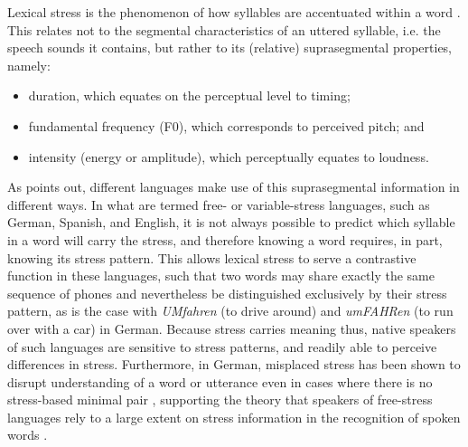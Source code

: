 			Lexical stress is the phenomenon of how syllables are accentuated within a word  \citep{Cutler2005}. This relates not to the segmental characteristics of an uttered syllable, i.e. the speech sounds it contains, but rather to its (relative) suprasegmental properties, namely: %
			\begin{itemize}
			\item duration, which equates on the perceptual level to timing;
			\item fundamental frequency (F0), which corresponds to perceived pitch; and
			\item intensity (energy or amplitude), which perceptually equates to loudness.
			\end{itemize}

		
		
					As \textcite{Cutler2005} points out, different languages make use of this suprasegmental information in different ways.
			In what are termed free- or variable-stress languages, such as German, Spanish, and English, it is not always possible to predict which syllable in a word will carry the stress, and therefore knowing a word requires, in part, knowing its stress pattern. This allows lexical stress to serve a contrastive function in these languages, such that two words may share exactly the same sequence of phones and nevertheless be distinguished exclusively by their stress pattern, as is the case with \textit{UMfahren} (to drive around) and \textit{umFAHRen} (to run over with a car) in German. %
Because stress carries meaning thus, native speakers of such languages are sensitive to stress patterns, and readily able to perceive differences in stress. %
Furthermore, in German, misplaced stress has been shown to disrupt understanding of a word or utterance even in cases where there is no stress-based minimal pair \citep{Hirschfeld1994}, supporting the theory that speakers of free-stress languages rely to a large extent on stress information in the recognition of spoken words \citep{Cutler2005}.


